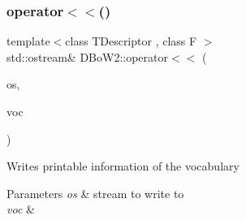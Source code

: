 \subsubsection{\texorpdfstring{operator$<$$<$()}{operator<<()}\hspace{0.1cm}{\footnotesize\ttfamily [3/3]}}
{\footnotesize\ttfamily template$<$class T\+Descriptor , class F $>$ \\
std\+::ostream\& D\+Bo\+W2\+::operator$<$$<$ (\begin{DoxyParamCaption}\item[{std\+::ostream \&}]{os,  }\item[{const \mbox{\hyperlink{class_d_bo_w2_1_1_templated_vocabulary}{Templated\+Vocabulary}}$<$ T\+Descriptor, F $>$ \&}]{voc }\end{DoxyParamCaption})}

Writes printable information of the vocabulary 
\begin{DoxyParams}{Parameters}
{\em os} & stream to write to \\
\hline
{\em voc} & \\
\hline
\end{DoxyParams}
